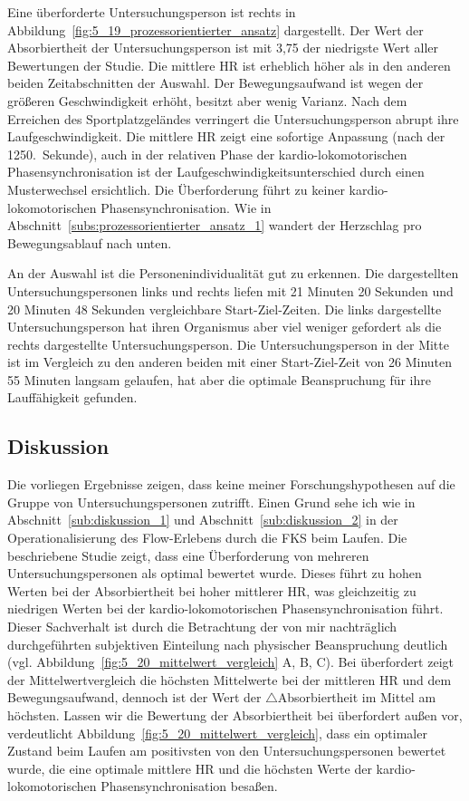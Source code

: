 Eine überforderte Untersuchungsperson ist rechts in Abbildung~\ref{fig:5_19_prozessorientierter_ansatz} dargestellt. Der Wert der Absorbiertheit der Untersuchungsperson ist mit 3,75 der niedrigste Wert aller Bewertungen der Studie. Die mittlere \ac{HR} ist erheblich höher als in den anderen beiden Zeitabschnitten der Auswahl. Der Bewegungsaufwand ist wegen der größeren Geschwindigkeit erhöht, besitzt aber wenig Varianz. Nach dem Erreichen des Sportplatzgeländes verringert die Untersuchungsperson abrupt ihre Laufgeschwindigkeit. Die mittlere \ac{HR} zeigt eine sofortige Anpassung (nach der 1250.~Sekunde), auch in der relativen Phase der kardio-lokomotorischen Phasensynchronisation ist der Laufgeschwindigkeitsunterschied durch einen Musterwechsel ersichtlich. Die Überforderung führt zu keiner kardio-lokomotorischen Phasensynchronisation. Wie in Abschnitt~\ref{subs:prozessorientierter_ansatz_1} wandert der Herzschlag pro Bewegungsablauf nach unten.

An der Auswahl ist die Personenindividualität gut zu erkennen. Die dargestellten Untersuchungspersonen links und rechts liefen mit 21 Minuten 20 Sekunden und 20 Minuten 48 Sekunden vergleichbare Start-Ziel-Zeiten. Die links dargestellte Untersuchungsperson hat ihren Organismus aber viel weniger gefordert als die rechts dargestellte Untersuchungsperson. Die Untersuchungsperson in der Mitte ist im Vergleich zu den anderen beiden mit einer Start-Ziel-Zeit von 26 Minuten 55 Minuten langsam gelaufen, hat aber die optimale Beanspruchung für ihre Lauffähigkeit gefunden. 

\subsection{Diskussion}
\label{sub:diskussion_3}
Die vorliegen Ergebnisse zeigen, dass keine meiner Forschungshypothesen auf die Gruppe von Untersuchungspersonen zutrifft. Einen Grund sehe ich wie in Abschnitt~\ref{sub:diskussion_1} und Abschnitt~\ref{sub:diskussion_2} in der Operationalisierung des Flow-Erlebens durch die \ac{FKS} beim Laufen. Die beschriebene Studie zeigt, dass eine Überforderung von mehreren Untersuchungspersonen als optimal bewertet wurde. Dieses führt zu hohen Werten bei der Absorbiertheit bei hoher mittlerer \ac{HR}, was gleichzeitig zu niedrigen Werten bei der kardio-lokomotorischen Phasensynchronisation führt. Dieser Sachverhalt ist durch die Betrachtung der von mir nachträglich durchgeführten subjektiven Einteilung nach physischer Beanspruchung deutlich (vgl. Abbildung~\ref{fig:5_20_mittelwert_vergleich} A, B, C). Bei überfordert zeigt der Mittelwertvergleich die höchsten Mittelwerte bei der mittleren \ac{HR} und dem Bewegungsaufwand, dennoch ist der Wert der $\bigtriangleup$Absorbiertheit im Mittel am höchsten. Lassen wir die Bewertung der Absorbiertheit bei überfordert außen vor, verdeutlicht Abbildung~\ref{fig:5_20_mittelwert_vergleich}, dass ein optimaler Zustand beim Laufen am positivsten von den Untersuchungspersonen bewertet wurde, die eine optimale mittlere \ac{HR} und die höchsten Werte der kardio-lokomotorischen Phasensynchronisation besaßen.

